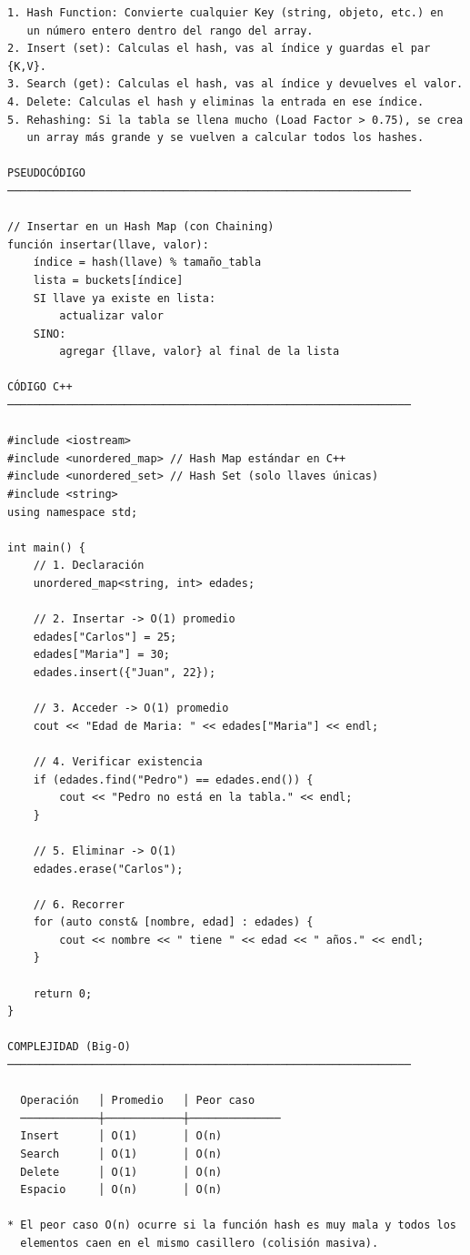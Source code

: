 \begin{lstlisting}
1. Hash Function: Convierte cualquier Key (string, objeto, etc.) en
   un número entero dentro del rango del array.
2. Insert (set): Calculas el hash, vas al índice y guardas el par {K,V}.
3. Search (get): Calculas el hash, vas al índice y devuelves el valor.
4. Delete: Calculas el hash y eliminas la entrada en ese índice.
5. Rehashing: Si la tabla se llena mucho (Load Factor > 0.75), se crea
   un array más grande y se vuelven a calcular todos los hashes.

PSEUDOCÓDIGO
──────────────────────────────────────────────────────────────

// Insertar en un Hash Map (con Chaining)
función insertar(llave, valor):
    índice = hash(llave) % tamaño_tabla
    lista = buckets[índice]
    SI llave ya existe en lista:
        actualizar valor
    SINO:
        agregar {llave, valor} al final de la lista

CÓDIGO C++
──────────────────────────────────────────────────────────────

#include <iostream>
#include <unordered_map> // Hash Map estándar en C++
#include <unordered_set> // Hash Set (solo llaves únicas)
#include <string>
using namespace std;

int main() {
    // 1. Declaración
    unordered_map<string, int> edades;

    // 2. Insertar -> O(1) promedio
    edades["Carlos"] = 25;
    edades["Maria"] = 30;
    edades.insert({"Juan", 22});

    // 3. Acceder -> O(1) promedio
    cout << "Edad de Maria: " << edades["Maria"] << endl;

    // 4. Verificar existencia
    if (edades.find("Pedro") == edades.end()) {
        cout << "Pedro no está en la tabla." << endl;
    }

    // 5. Eliminar -> O(1)
    edades.erase("Carlos");

    // 6. Recorrer
    for (auto const& [nombre, edad] : edades) {
        cout << nombre << " tiene " << edad << " años." << endl;
    }

    return 0;
}

COMPLEJIDAD (Big-O)
──────────────────────────────────────────────────────────────

  Operación   │ Promedio   │ Peor caso
  ────────────┼────────────┼──────────────
  Insert      │ O(1)       │ O(n)
  Search      │ O(1)       │ O(n)
  Delete      │ O(1)       │ O(n)
  Espacio     │ O(n)       │ O(n)

* El peor caso O(n) ocurre si la función hash es muy mala y todos los
  elementos caen en el mismo casillero (colisión masiva).
\end{lstlisting}

